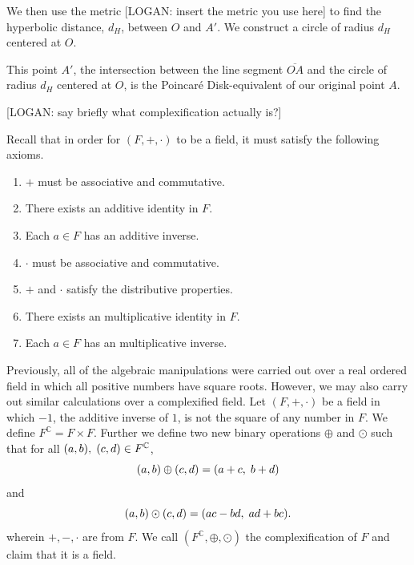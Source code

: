 \documentclass[12pt]{article}
\newcommand{\C}{\mathbb{C}}
\newcommand{\fc}{F^{\C}}
\newcommand{\poincare}{Poincar\'{e} }
\newcommand{\ttc}{, \hspace{1mm}}
\theoremstyle{plain}
\theoremstyle{definition}
\begin{document}
We then use the metric [LOGAN: insert the metric you use here] to find the hyperbolic distance, $d_H$, between $O$ and $A'$. We construct a circle of radius $d_H$ centered at $O$.

\begin{center}
\end{center}

This point $A'$, the intersection between the line segment $\overline{OA}$ and the circle of radius $d_H$ centered at $O$, is the \poincare Disk-equivalent of our original point $A$.

\newpage 
\wtftitle{Appendix A2: Proof that $\fc$ Is a Field}

[LOGAN: say briefly what complexification actually is?]

\noindent Recall that in order for $(F,+,\cdot)$ to be a field, it must satisfy the following axioms.
\begin{enumerate}
	\item $+$ must be associative and commutative.
	\item There exists an additive identity in $F$.
	\item Each $a\in F$ has an additive inverse.
	\item $\cdot$ must be associative and commutative.
	\item $+$ and $\cdot$ satisfy the distributive properties.
	\item There exists an multiplicative identity in $F$.
	\item Each $a\in F$ has an multiplicative inverse.
\end{enumerate}
Previously, all of the algebraic manipulations were carried out over a real ordered field in which all positive numbers have square roots. However, we may also carry out similar calculations over a complexified field. Let $(F,+,\cdot)$ be a field in which $-1$, the additive inverse of $1$, is not the square of any number in $F$. We define $F^\C = F\times F$. Further we define two new binary operations $\oplus$ and $\odot$ such that for all $(a,b)\ttc (c,d)\in F^\C$,
	\[
		(a,b)\oplus(c,d) = (a + c\ttc b + d)
	\]
and
	\[
		(a,b)\odot(c,d) = (ac - bd\ttc ad + bc).
	\]
wherein $+,-,\cdot$ are from $F$. We call $(F^\C,\oplus,\odot)$ the complexification of $F$ and claim that it is a field. 
\end{document}
